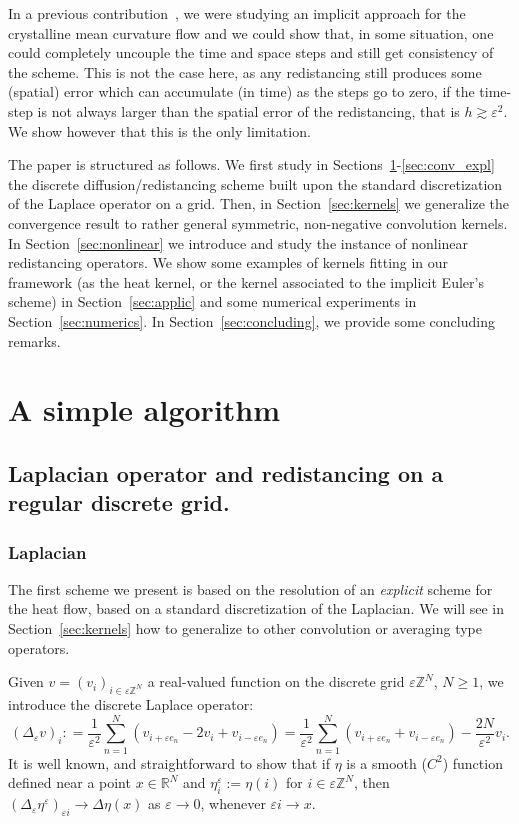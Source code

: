 \documentclass[10pt]{amsart}
\theoremstyle{plain}
\theoremstyle{definition}
\newcommand{\R}{\mathbb{R}}
\newcommand{\Z}{\mathbb{Z}}
\newcommand{\e}{\varepsilon}
\newcommand{\ez}{\e\Z^N}
\numberwithin{equation}{section}
\begin{document}
In a previous contribution~\cite{CDGM-crystal}, we were studying an implicit
approach for the crystalline mean curvature flow and we could show that, in some situation,
one could completely uncouple the time and space steps and
still get consistency of the scheme. This is not the case here,
as any redistancing still produces some (spatial) error which can
accumulate (in time) as the steps go to zero, if the time-step
is not always larger than the spatial error of the redistancing, that is  
$h\gtrsim \e^2$.
We show however that this is the only limitation.


The paper is structured as follows. 
We first study  in Sections~{\ref{sec:base_algo}-\ref{sec:conv_expl}} the discrete   
diffusion/redistancing scheme
built upon the standard discretization of the Laplace operator on a grid.
Then, in Section~\ref{sec:kernels} we generalize the convergence result to rather general symmetric,
non-negative convolution kernels.
In Section~\ref{sec:nonlinear} we introduce and study the instance of nonlinear redistancing operators.
We show some examples of kernels fitting in our framework (as the heat kernel, or the kernel associated to the implicit Euler's scheme) in Section~\ref{sec:applic} and some numerical experiments in Section~\ref{sec:numerics}. 
In Section~\ref{sec:concluding}, we provide some concluding remarks.


\section{A simple algorithm}\label{sec:base_algo}
\subsection{Laplacian operator and redistancing on a regular discrete grid.}

\subsubsection*{Laplacian}
The first scheme we present is based on the resolution of an \textit{explicit} scheme for the
heat flow, based on a standard discretization of the Laplacian. We will see
in Section~\ref{sec:kernels} how to generalize to other convolution
or averaging type operators.

Given $v=(v_i)_{i\in\ez}$ a real-valued function on the discrete grid $\ez$, $N\ge 1$,
we introduce the discrete Laplace operator:
\[
  ( \Delta_\e v)_i : = \frac{1}{\e^2}\sum_{n=1}^N (v_{i+\e e_n} - 2v_i + v_{i-\e e_n})
  = \frac{1}{\e^2}\sum_{n=1}^N (v_{i+\e e_n} + v_{i-\e e_n}) - \frac{2N}{\e^2}v_i.
\]
It is well known, and straightforward to show that if $\eta$ is a smooth ($C^2$) function
defined near a point $x\in\R^N$ and  {$\eta^\e_i:=\eta( i)$ for $i\in\ez$}, then $(\Delta_\e \eta^\e)_{\e i}\to \Delta \eta(x)$
as $\e\to 0$, whenever $\e i\to x$.
\end{document}
